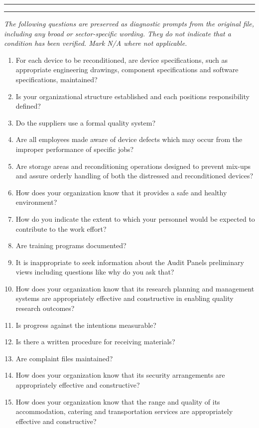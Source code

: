 \documentclass[10pt,letterpaper]{article}
\newcommand{\writelines}{\par\noindent\color{rulegrey}\rule{\linewidth}{.35pt}\par\vspace{7pt}\rule{\linewidth}{.35pt}\color{black}\par\vspace{7pt}}
\newcommand{\docsection}[1]{\par\Needspace{5\baselineskip}\vspace{8pt}{\large\sffamily\bfseries\color{navy}#1}\par\vspace{2pt}{\color{rulegrey}\rule{\linewidth}{.6pt}}\par}
\newcommand{\smallsection}[1]{\par\Needspace{3\baselineskip}\vspace{5pt}{\normalsize\sffamily\bfseries\color{blue}#1}\par}
\begin{document}
\smallsection{Comments}
\writelines
\docsection{03 \quad Source diagnostic checklist}
\textit{The following questions are preserved as diagnostic prompts from the original file, including any broad or sector-specific wording. They do not indicate that a condition has been verified. Mark N/A where not applicable.}
\begingroup\small\begin{enumerate}[leftmargin=2.1em, itemsep=4pt]
\item[1.] For each device to be reconditioned, are device specifications, such as appropriate engineering drawings, component specifications and software specifications, maintained?
\item[2.] Is your organizational structure established and each positions responsibility defined?
\item[3.] Do the suppliers use a formal quality system?
\item[4.] Are all employees made aware of device defects which may occur from the improper performance of specific jobs?
\item[5.] Are storage areas and reconditioning operations designed to prevent mix-ups and assure orderly handling of both the distressed and reconditioned devices?
\item[6.] How does your organization know that it provides a safe and healthy environment?
\item[7.] How do you indicate the extent to which your personnel would be expected to contribute to the work effort?
\item[8.] Are training programs documented?
\item[9.] It is inappropriate to seek information about the Audit Panels preliminary views including questions like why do you ask that?
\item[10.] How does your organization know that its research planning and management systems are appropriately effective and constructive in enabling quality research outcomes?
\item[11.] Is progress against the intentions measurable?
\item[12.] Is there a written procedure for receiving materials?
\item[13.] Are complaint files maintained?
\item[14.] How does your organization know that its security arrangements are appropriately effective and constructive?
\item[15.] How does your organization know that the range and quality of its accommodation, catering and transportation services are appropriately effective and constructive?

\end{enumerate}
\end{document}
